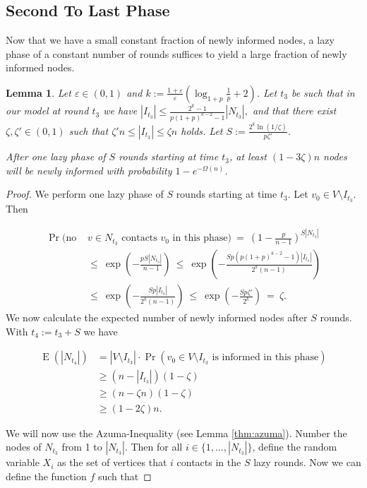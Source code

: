 \documentclass[12pt]{article}
\newtheorem{lemma}[theorem]{Lemma}
\newcommand{\e}{\varepsilon}
\DeclareMathOperator{\E}{E}
\begin{document}
{\subsection{Second To Last Phase}

Now that we have a small constant fraction of newly informed nodes, a lazy phase of a constant number of rounds suffices to yield a large fraction of newly informed nodes.

\begin{lemma}\label{LazyPhase3}
Let $\e \in (0,1)$ and $k := \frac{1+\e}{\e}\left(\log_{1+p}\frac{1}{p} + 2\right)$.
Let $t_3$ be such that in our model at round $t_3$ we have $
|I_{t_3}| \leq \frac{2^k-1}{p(1+p)^{k-2}-1}|N_{t_3}|,$
and that there exist $\zeta, \zeta' \in (0,1)$ such that
 $\zeta'n \leq |I_{t_3}| \leq \zeta n$ holds.
Let $S:=\frac{2^k\ln(1/\zeta)}{p\zeta'}$.

 After one lazy phase of $S$ rounds starting at time $t_3$, at least $\left(1-3\zeta\right)n$ nodes will be newly informed with probability $1-e^{-\Omega(n)}$.
\end{lemma}
\begin{proof}
We perform one lazy phase of $S$ rounds starting at time $t_3$. Let $v_0\in V\setminus I_{t_3}$. Then

\begin{align*}
\Pr(\mbox{no } &v\in N_{t_3}\mbox{ contacts }v_0\mbox{ in this phase})\ =\ \left(1-\frac{p}{n-1}\right)^{S|N_{t_3}|}\\
&\leq\ \exp\left(-\frac{pS|N_{t_3}|}{n-1}\right)\ 
\leq\ \exp\left(-\frac{Sp(p(1+p)^{k-2}-1)|I_{t_3}|}{2^k(n-1)}\right)\\
&\leq\ \exp\left(-\frac{Sp|I_{t_3}|}{2^k(n-1)}\right)\ 
\leq\ \exp\left(-\frac{Sp\zeta'}{2^k}\right)\
=\ \zeta.
\end{align*}
We now calculate the expected number of newly informed nodes after $S$ rounds. With $t_4:=t_3+S$ we have

\begin{align*}
\E\left(|N_{t_4}|\right) &= |V\setminus I_{t_3}|\cdot \Pr(v_0\in V\setminus I_{t_3}\mbox{ is informed in this phase})\\
&\geq (n-|I_{t_3}|)\left(1-\zeta\right)\\
&\geq \left(n-\zeta n\right)\left(1-\zeta\right)\\
&\geq (1-2\zeta)n.
\end{align*}


We will now use the Azuma-Inequality (see Lemma
\ref{thm:azuma}). Number the nodes of $N_{t_3}$ from 1 to $|N_{t_3}|$. 
Then for all $i\in\{1,\dots,|N_{t_3}|\}$, define the random variable $X_i$ as the set of vertices that $i$ contacts in the $S$ lazy rounds. 
Now we can define the function $f$ such that


\end{proof}}
\end{document}
